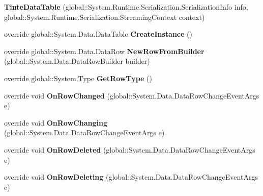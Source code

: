 \begin{DoxyCompactItemize}
\item 
{\bfseries Tinte\+Data\+Table} (global\+::\+System.\+Runtime.\+Serialization.\+Serialization\+Info info, global\+::\+System.\+Runtime.\+Serialization.\+Streaming\+Context context)\hypertarget{class_products_1_1_data_1_1ds_sage_1_1_tinte_data_table_a869e10f070ac065c732c09ec09d84045}{}\label{class_products_1_1_data_1_1ds_sage_1_1_tinte_data_table_a869e10f070ac065c732c09ec09d84045}

\item 
override global\+::\+System.\+Data.\+Data\+Table {\bfseries Create\+Instance} ()\hypertarget{class_products_1_1_data_1_1ds_sage_1_1_tinte_data_table_a1ba011cf7f189eb1ef50d2bd0c56be04}{}\label{class_products_1_1_data_1_1ds_sage_1_1_tinte_data_table_a1ba011cf7f189eb1ef50d2bd0c56be04}

\item 
override global\+::\+System.\+Data.\+Data\+Row {\bfseries New\+Row\+From\+Builder} (global\+::\+System.\+Data.\+Data\+Row\+Builder builder)\hypertarget{class_products_1_1_data_1_1ds_sage_1_1_tinte_data_table_afbee77e2bf198de2f714e45de8a44b0d}{}\label{class_products_1_1_data_1_1ds_sage_1_1_tinte_data_table_afbee77e2bf198de2f714e45de8a44b0d}

\item 
override global\+::\+System.\+Type {\bfseries Get\+Row\+Type} ()\hypertarget{class_products_1_1_data_1_1ds_sage_1_1_tinte_data_table_adb5bf0f7100ec9a8c7846c7f8abb075c}{}\label{class_products_1_1_data_1_1ds_sage_1_1_tinte_data_table_adb5bf0f7100ec9a8c7846c7f8abb075c}

\item 
override void {\bfseries On\+Row\+Changed} (global\+::\+System.\+Data.\+Data\+Row\+Change\+Event\+Args e)\hypertarget{class_products_1_1_data_1_1ds_sage_1_1_tinte_data_table_a5a4f1b09d16c8e05b7538a8a491e5d0e}{}\label{class_products_1_1_data_1_1ds_sage_1_1_tinte_data_table_a5a4f1b09d16c8e05b7538a8a491e5d0e}

\item 
override void {\bfseries On\+Row\+Changing} (global\+::\+System.\+Data.\+Data\+Row\+Change\+Event\+Args e)\hypertarget{class_products_1_1_data_1_1ds_sage_1_1_tinte_data_table_aef681aa37093bcc827f9b9dc3a042244}{}\label{class_products_1_1_data_1_1ds_sage_1_1_tinte_data_table_aef681aa37093bcc827f9b9dc3a042244}

\item 
override void {\bfseries On\+Row\+Deleted} (global\+::\+System.\+Data.\+Data\+Row\+Change\+Event\+Args e)\hypertarget{class_products_1_1_data_1_1ds_sage_1_1_tinte_data_table_ad915eeef3319b323b4cc1ca8367205bb}{}\label{class_products_1_1_data_1_1ds_sage_1_1_tinte_data_table_ad915eeef3319b323b4cc1ca8367205bb}

\item 
override void {\bfseries On\+Row\+Deleting} (global\+::\+System.\+Data.\+Data\+Row\+Change\+Event\+Args e)\hypertarget{class_products_1_1_data_1_1ds_sage_1_1_tinte_data_table_a04b74f4d0ec4de5732e2307fb2593d1c}{}\label{class_products_1_1_data_1_1ds_sage_1_1_tinte_data_table_a04b74f4d0ec4de5732e2307fb2593d1c}

\end{DoxyCompactItemize}
